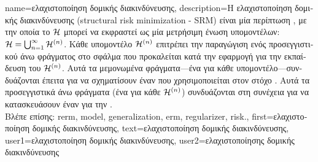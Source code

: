{name={\foreignlanguage{greek}{ελαχιστοποίηση δομικής διακινδύνευσης}}, 
	description={\foreignlanguage{greek}{Η ελαχιστοποί\-ηση δομικής διακινδύνευσης} 
		(structural risk minimization - SRM) \foreignlanguage{greek}{είναι μία περίπτωση} 
		, \foreignlanguage{greek}{με την οποία το}  $\mathcal{H}$ \foreignlanguage{greek}{μπορεί  
		να εκφραστεί ως μία μετρήσιμη ένωση υπομοντέλων: $\mathcal{H} = \bigcup_{n=1}^{\infty} \mathcal{H}^{(n)}$. 
		Κάθε υπομοντέλο $\mathcal{H}^{(n)}$ επιτρέπει την παραγώγιση ενός προσεγγιστικού άνω φράγματος στο σφάλμα}  
		 \foreignlanguage{greek}{που προκαλείται κατά την εφαρμογή}  
		\foreignlanguage{greek}{για την εκπαίδευση του $\mathcal{H}^{(n)}$. 
		Αυτά τα μεμονωμένα φράγματα—ένα για κάθε υπομοντέλο—συνδυάζονται έπειτα για να σχηματίσουν έναν}  
		\foreignlanguage{greek}{που χρησιμοποιείται στον στόχο} . 
        		\foreignlanguage{greek}{Αυτά τα προσεγγιστικά άνω φράγματα (ένα για κάθε $\mathcal{H}^{(n)}$) συνδυάζονται στη συνέχεια 
		για να κατασκευάσουν έναν}  \foreignlanguage{greek}{για την}  \cite[Sec.\ 7.2]{ShalevMLBook}.\\
		\foreignlanguage{greek}{Βλέπε επίσης:} \gls{rerm}, \gls{model}, \gls{generalization}, \gls{erm}, \gls{regularizer}, \gls{risk}.},
	first={\foreignlanguage{greek}{ελαχιστοποίηση δομικής διακινδύνευσης}},
	text={\foreignlanguage{greek}{ελαχιστοποίηση δομικής διακινδύνευσης}},
	user1={\foreignlanguage{greek}{ελαχιστοποίηση δομικής διακινδύνευσης}}, %
  	user2={\foreignlanguage{greek}{ελαχιστοποίησης δομικής διακινδύνευσης}} %
 }

